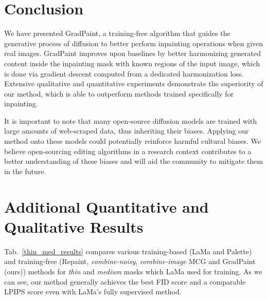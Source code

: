 \section{Conclusion}

We have presented GradPaint, a training-free algorithm that guides the generative process of diffusion to better perform inpainting operations when given real images. GradPaint improves upon baselines by better harmonizing generated content inside the inpainting mask with known regions of the input image, which is done via gradient descent computed from a dedicated harmonization loss. Extensive qualitative and quantitative experiments demonstrate the superiority of our method, which is able to outperform methods trained specifically for inpainting.

It is important to note that many open-source diffusion models are trained with large amounts of web-scraped data, thus inheriting their biases. Applying our method onto these models could potentially reinforce harmful cultural biases. We believe open-sourcing editing algorithms in a research context contributes to a better understanding of these biases and will aid the community to mitigate them in the future.


%




\section{Additional Quantitative and Qualitative Results}


Tab.~\ref{thin_med_results} compares various training-based (LaMa and Palette) and training-free (Repaint, \emph{combine-noisy}, \emph{combine-image} MCG and GradPaint (ours)) methods for \emph{thin} and \emph{medium} masks which LaMa used for training. As we can see, our method generally achieves the best FID score and a comparable LPIPS score even with LaMa's fully supervised method.  

